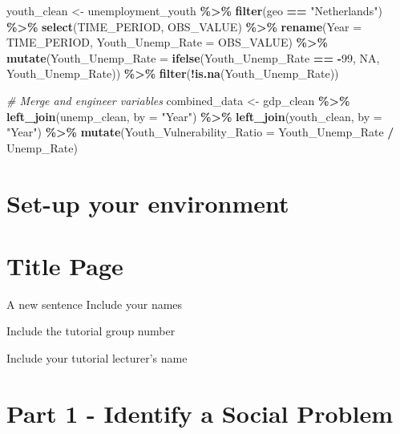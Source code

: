 \documentclass[
]{article}
\newenvironment{Shaded}{\begin{snugshade}}{\end{snugshade}}
\newcommand{\AttributeTok}[1]{\textcolor[rgb]{0.13,0.29,0.53}{#1}}
\newcommand{\CommentTok}[1]{\textcolor[rgb]{0.56,0.35,0.01}{\textit{#1}}}
\newcommand{\ConstantTok}[1]{\textcolor[rgb]{0.56,0.35,0.01}{#1}}
\newcommand{\DecValTok}[1]{\textcolor[rgb]{0.00,0.00,0.81}{#1}}
\newcommand{\FunctionTok}[1]{\textcolor[rgb]{0.13,0.29,0.53}{\textbf{#1}}}
\newcommand{\NormalTok}[1]{#1}
\newcommand{\OtherTok}[1]{\textcolor[rgb]{0.56,0.35,0.01}{#1}}
\newcommand{\SpecialCharTok}[1]{\textcolor[rgb]{0.81,0.36,0.00}{\textbf{#1}}}
\newcommand{\StringTok}[1]{\textcolor[rgb]{0.31,0.60,0.02}{#1}}
\begin{document}
\begin{Shaded}
\begin{Highlighting}[]
\NormalTok{youth\_clean }\OtherTok{\textless{}{-}}\NormalTok{ unemployment\_youth }\SpecialCharTok{\%\textgreater{}\%} 
  \FunctionTok{filter}\NormalTok{(geo }\SpecialCharTok{==} \StringTok{"Netherlands"}\NormalTok{) }\SpecialCharTok{\%\textgreater{}\%}
  \FunctionTok{select}\NormalTok{(TIME\_PERIOD, OBS\_VALUE) }\SpecialCharTok{\%\textgreater{}\%}
  \FunctionTok{rename}\NormalTok{(}\AttributeTok{Year =}\NormalTok{ TIME\_PERIOD, }\AttributeTok{Youth\_Unemp\_Rate =}\NormalTok{ OBS\_VALUE) }\SpecialCharTok{\%\textgreater{}\%}
  \FunctionTok{mutate}\NormalTok{(}\AttributeTok{Youth\_Unemp\_Rate =} \FunctionTok{ifelse}\NormalTok{(Youth\_Unemp\_Rate }\SpecialCharTok{==} \SpecialCharTok{{-}}\DecValTok{99}\NormalTok{, }\ConstantTok{NA}\NormalTok{, Youth\_Unemp\_Rate)) }\SpecialCharTok{\%\textgreater{}\%}
  \FunctionTok{filter}\NormalTok{(}\SpecialCharTok{!}\FunctionTok{is.na}\NormalTok{(Youth\_Unemp\_Rate))}

\CommentTok{\# Merge and engineer variables}
\NormalTok{combined\_data }\OtherTok{\textless{}{-}}\NormalTok{ gdp\_clean }\SpecialCharTok{\%\textgreater{}\%}
  \FunctionTok{left\_join}\NormalTok{(unemp\_clean, }\AttributeTok{by =} \StringTok{"Year"}\NormalTok{) }\SpecialCharTok{\%\textgreater{}\%}
  \FunctionTok{left\_join}\NormalTok{(youth\_clean, }\AttributeTok{by =} \StringTok{"Year"}\NormalTok{) }\SpecialCharTok{\%\textgreater{}\%}
  \FunctionTok{mutate}\NormalTok{(}\AttributeTok{Youth\_Vulnerability\_Ratio =}\NormalTok{ Youth\_Unemp\_Rate }\SpecialCharTok{/}\NormalTok{ Unemp\_Rate)}
\end{Highlighting}
\end{Shaded}

\section{Set-up your environment}\label{set-up-your-environment}

\section{Title Page}\label{title-page}

A new sentence Include your names

Include the tutorial group number

Include your tutorial lecturer's name

\section{Part 1 - Identify a Social
Problem}\label{part-1---identify-a-social-problem}
\end{document}
